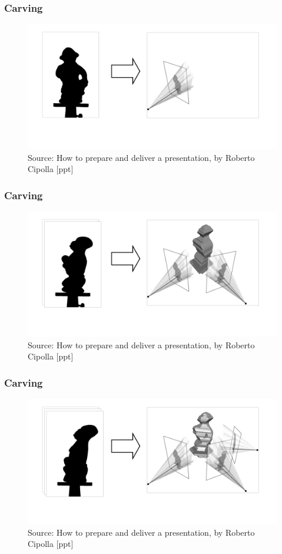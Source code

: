 \documentclass{beamer}
\begin{document}
\begin{frame}
  \frametitle{Carving}
  \begin{figure}[htb!]
   \centering
   \includegraphics[width=1.0\textwidth]{img/carving1}
   \caption*{\tiny Source: How to prepare and deliver a presentation, by Roberto Cipolla [ppt]}
   \label{fig:carving1}
  \end{figure}
\end{frame}
\begin{frame}
  \frametitle{Carving}
  \begin{figure}[htb!]
   \centering
   \includegraphics[width=1.0\textwidth]{img/carving2}
   \caption*{\tiny Source: How to prepare and deliver a presentation, by Roberto Cipolla [ppt]}
   \label{fig:carving2}
  \end{figure}
\end{frame}
\begin{frame}
  \frametitle{Carving}
  \begin{figure}[htb!]
   \centering
   \includegraphics[width=1.0\textwidth]{img/carving3}
   \caption*{\tiny Source: How to prepare and deliver a presentation, by Roberto Cipolla [ppt]}
   \label{fig:carving3}
  \end{figure}
\end{frame}
\end{document}
